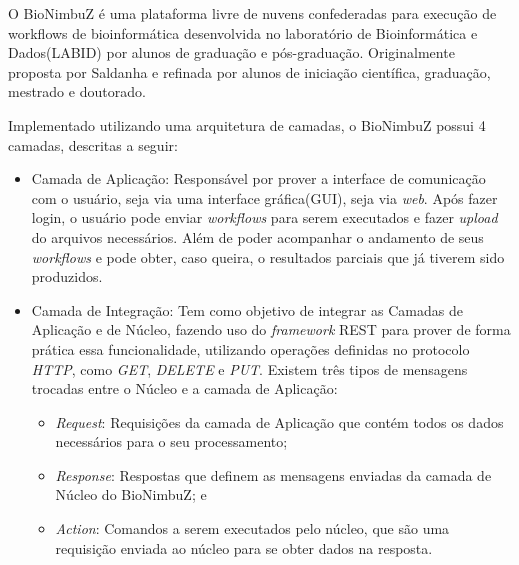 O BioNimbuZ é uma plataforma livre de nuvens confederadas para execução de workflows de bioinformática desenvolvida no laboratório de Bioinformática e Dados(LABID) por alunos de graduação e pós-graduação. Originalmente proposta por Saldanha\cite{Saldanha_BioNimbus} e refinada por alunos de iniciação científica, graduação, mestrado e doutorado.\cite{closer12_BioNimbuZ_AHP}\cite{BioNimbuZ_6846526} \cite{6732620_BioNimbuZ_ACOsched}\cite{BioNimbuZ_Breno_Deric}\cite{BioNimbuZ_Vegara}\cite{BioNimbuZ_Willian_C99}

Implementado utilizando uma arquitetura de camadas, o BioNimbuZ possui 4 camadas, descritas a seguir:
\begin{itemize}
	\item Camada de Aplicação: Responsável por prover a interface de comunicação com o usuário, seja via uma interface gráfica(GUI), seja via \textit{web}. Após fazer login, o usuário pode enviar \textit{workflows} para serem executados e fazer \textit{upload} do arquivos necessários. Além de poder acompanhar o andamento de seus \textit{workflows} e pode obter, caso queira, o resultados parciais que já tiverem sido produzidos.
	
	\item Camada de Integração: Tem como objetivo de integrar as Camadas de Aplicação e de Núcleo, fazendo uso do \textit{framework} \acrshort{REST} para prover de forma prática essa funcionalidade, utilizando operações definidas no protocolo \textit{HTTP}, como \textit{GET}, \textit{DELETE} e \textit{PUT}.
	Existem três tipos de mensagens trocadas entre o Núcleo e a camada de Aplicação:
	\begin{itemize}
		\item \textit{Request}: Requisições da camada de Aplicação que contém todos os dados necessários para o seu processamento;
		\item \textit{Response}: Respostas que definem as mensagens enviadas da camada de Núcleo do BioNimbuZ; e
		\item \textit{Action}: Comandos a serem executados pelo núcleo, que são uma requisição enviada ao núcleo para se obter dados na resposta.
	\end{itemize}
	

\end{itemize}
